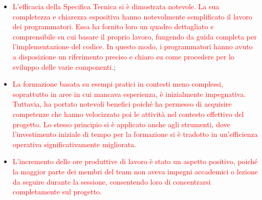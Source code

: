 \begin{itemize}
    \item \textcolor{red}{L'efficacia della Specifica Tecnica si è dimostrata notevole. La sua completezza e chiarezza espositiva hanno notevolmente semplificato il lavoro dei programmatori. Essa ha fornito loro un quadro dettagliato e comprensibile su cui basare il proprio lavoro, fungendo da guida completa per l'implementazione del codice. In questo modo, i programmatori hanno avuto a disposizione un riferimento preciso e chiaro su come procedere per lo sviluppo delle varie componenti.};
    \item \textcolor{red}{La formazione basata su esempi pratici in contesti meno complessi, soprattutto in aree in cui mancava esperienza, è inizialmente impegnativa. Tuttavia, ha portato notevoli benefici poiché ha permesso di acquisire competenze che hanno velocizzato poi le attività nel contesto effettivo del progetto. Lo stesso principio si è applicato anche agli strumenti, dove l'investimento iniziale di tempo per la formazione si è tradotto in un'efficienza operativa significativamente migliorata.}
    \item \textcolor{red}{L'incremento delle ore produttive di lavoro è stato un aspetto positivo, poiché la maggior parte dei membri del team non aveva impegni accademici o lezione da seguire durante la sessione, consentendo loro di concentrarsi completamente sul progetto.}
\end{itemize}